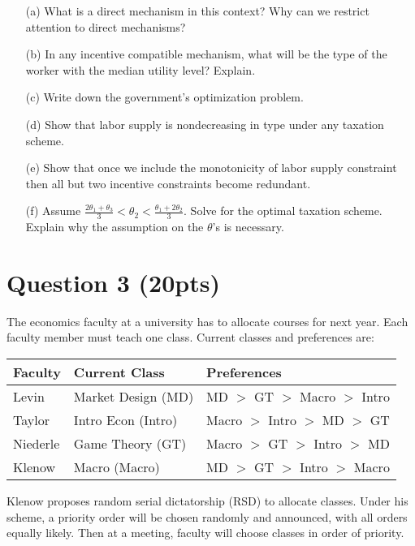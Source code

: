 \documentclass[10pt,a4paper]{article}
\begin{document}
   \begin{enumerate}
        \item[(a)] What is a direct mechanism in this context? Why can we restrict attention to direct mechanisms?
        \item[(b)] In any incentive compatible mechanism, what will be the type of the worker with the median utility level? Explain.
        \item[(c)] Write down the government's optimization problem.
        \item[(d)] Show that labor supply is nondecreasing in type under any taxation scheme.
        \item[(e)] Show that once we include the monotonicity of labor supply constraint then all but two incentive constraints become redundant.
        \item[(f)] Assume $\frac{2\theta_1+\theta_3}{3} < \theta_2 < \frac{\theta_1+2\theta_2}{3}$. Solve for the optimal taxation scheme. Explain why the assumption on the $\theta$'s is necessary.
    \end{enumerate}

\section*{Question 3 (20pts)}
  The economics faculty at a university has to allocate courses for next year. Each faculty member must teach one class. Current classes and preferences are:
  
  \begin{center}
    \begin{tabular}{|l|l|l|}
      \hline
      \textbf{Faculty} & \textbf{Current Class} & \textbf{Preferences} \\
      \hline
      Levin & Market Design (MD) & MD $>$ GT $>$ Macro $>$ Intro \\
      \hline
      Taylor & Intro Econ (Intro) & Macro $>$ Intro $>$ MD $>$ GT \\
      \hline
      Niederle & Game Theory (GT) & Macro $>$ GT $>$ Intro $>$ MD \\
      \hline
      Klenow & Macro (Macro) & MD $>$ GT $>$ Intro $>$ Macro \\
      \hline
    \end{tabular}
  \end{center}

  Klenow proposes random serial dictatorship (RSD) to allocate classes. Under his scheme, a priority order will be chosen randomly and announced, with all orders equally likely. Then at a meeting, faculty will choose classes in order of priority.
\end{document}
